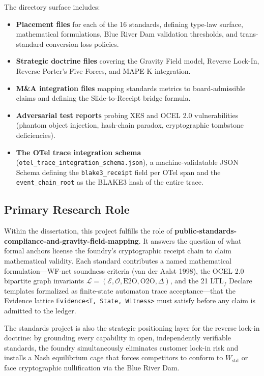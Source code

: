 The directory surface includes:
\begin{itemize}
  \item \textbf{Placement files} for each of the 16 standards, defining type-law surface,
        mathematical formulations, Blue River Dam validation thresholds, and trans-standard
        conversion loss policies.
  \item \textbf{Strategic doctrine files} covering the Gravity Field model, Reverse Lock-In,
        Reverse Porter's Five Forces, and MAPE-K integration.
  \item \textbf{M\&A integration files} mapping standards metrics to board-admissible claims
        and defining the Slide-to-Receipt bridge formula.
  \item \textbf{Adversarial test reports} probing XES and OCEL 2.0 vulnerabilities (phantom
        object injection, hash-chain paradox, cryptographic tombstone deficiencies).
  \item \textbf{The OTel trace integration schema} (\texttt{otel\_trace\_integration\_schema.json}),
        a machine-validatable JSON Schema defining the \texttt{blake3\_receipt} field per
        OTel span and the \texttt{event\_chain\_root} as the BLAKE3 hash of the entire trace.
\end{itemize}

\subsection{Primary Research Role}
\label{sec:standards-identity-role}

Within the dissertation, this project fulfills the role of
\textbf{public-standards-compliance-and-gravity-field-mapping}. It answers the question of
what formal anchors license the foundry's cryptographic receipt chain to claim mathematical
validity. Each standard contributes a named mathematical formulation---WF-net soundness
criteria (van der Aalst 1998), the OCEL 2.0 bipartite graph invariants
$\mathcal{L}=(\mathcal{E}, \mathcal{O}, \text{E2O}, \text{O2O}, \Delta)$, and the 21
LTL$_f$ Declare templates formalized as finite-state automaton trace acceptance---that the
Evidence lattice \texttt{Evidence<T, State, Witness>} must satisfy before any claim is
admitted to the ledger.

The standards project is also the strategic positioning layer for the reverse lock-in
doctrine: by grounding every capability in open, independently verifiable standards, the
foundry simultaneously eliminates customer lock-in risk and installs a Nash equilibrium
cage that forces competitors to conform to $W_{\text{std}}$ or face cryptographic
nullification via the Blue River Dam.

